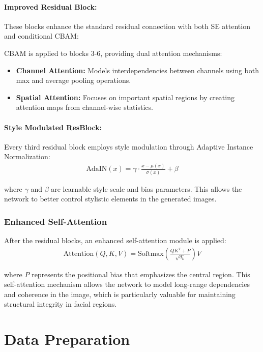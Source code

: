 \documentclass[twoside,english,notitlepage]{report}
\begin{document}
\paragraph{Improved Residual Block:} These blocks enhance the standard residual connection with both SE attention and conditional CBAM:

CBAM is applied to blocks 3-6, providing dual attention mechanisms:
\begin{itemize}
    \item \textbf{Channel Attention:} Models interdependencies between channels using both max and average pooling operations.
    \item \textbf{Spatial Attention:} Focuses on important spatial regions by creating attention maps from channel-wise statistics.
\end{itemize}

\paragraph{Style Modulated ResBlock:} Every third residual block employs style modulation through Adaptive Instance Normalization:
\begin{align}
    \text{AdaIN}(x) = \gamma \cdot \frac{x - \mu(x)}{\sigma(x)} + \beta
\end{align}

where $\gamma$ and $\beta$ are learnable style scale and bias parameters. This allows the network to better control stylistic elements in the generated images.

\subsubsection{Enhanced Self-Attention}
After the residual blocks, an enhanced self-attention module is applied:
\begin{align}
    \text{Attention}(Q, K, V) = \text{Softmax}\left(\frac{QK^T + P}{\sqrt{d_k}}\right)V
\end{align}

where $P$ represents the positional bias that emphasizes the central region. This self-attention mechanism allows the network to model long-range dependencies and coherence in the image, which is particularly valuable for maintaining structural integrity in facial regions.


\section{Data Preparation}
\end{document}

